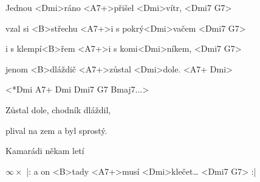 

\zs
Jednou <Dmi>ráno <A7+>přišel <Dmi>vítr, <Dmi7 G7>

vzal si <B>střechu <A7+>i s pokrý<Dmi>vačem <Dmi7 G7>

i s klempí<B>řem <A7+>i s komi<Dmi>níkem, <Dmi7 G7>

jenom <B>dláždič <A7+>zůstal <Dmi>dole. <A7+ Dmi>
\ks

<*Dmi A7+ Dmi Dmi7 G7 Bmaj7...>

\zs
Zůstal dole, chodník dláždil,

plival na zem a byl sprostý.

Kamarádi někam letí

$\infty\times$ |: a on <B>tady <A7+>musí <Dmi>klečet…  <Dmi7 G7> :|
\ks

\kp
